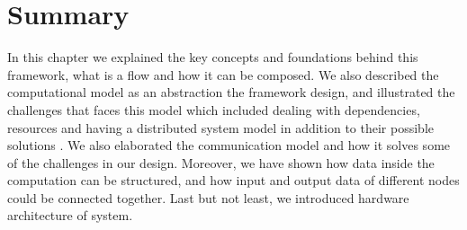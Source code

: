 \section{Summary}

In this chapter we explained the key concepts and foundations behind this framework, what is a flow and how it can be composed. We also described the computational model as an abstraction the framework design, and illustrated the challenges that faces this model which included  dealing with dependencies, resources and having a distributed system model in addition to their possible solutions . We also elaborated the communication model and how it solves some of the challenges in our design. Moreover, we have shown how data inside the computation can be structured, and how input and output data of different nodes could be connected together. Last but not least, we introduced hardware architecture of system. 


